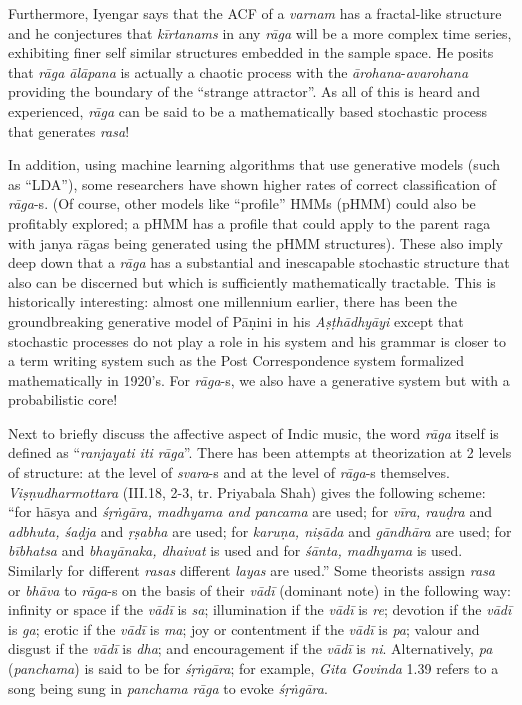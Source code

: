 Furthermore, Iyengar says that the ACF of a \textsl{varnam} has a fractal-like structure and he conjectures that \textsl{kīrtanams} in any \textsl{rāga} will be a more complex time series, exhibiting finer self similar structures embedded in the sample space. He posits that \textsl{rāga ālāpana} is actually a chaotic process with the \textsl{ārohana}-\textsl{avarohana} providing the boundary of the “strange attractor”. As all of this is heard and experienced, \textsl{rāga} can be said to be a mathematically based stochastic process that generates \textsl{rasa}!

In addition, using machine learning algorithms that use generative models (such as “LDA”), some researchers have shown higher rates of correct classification of \textsl{rāga}-s. (Of course, other models like “profile” HMMs (pHMM) could also be profitably explored; a pHMM has a profile that could apply to the parent raga with janya rāgas being generated using the pHMM structures). These also imply deep down that a \textsl{rāga} has a substantial and inescapable stochastic structure that also can be discerned but which is sufficiently mathematically tractable. This is historically interesting: almost one millennium earlier, there has been the groundbreaking generative model of Pāṇini in his \textsl{Aṣṭhādhyāyi} except that stochastic processes do not play a role in his system and his grammar is closer to a term writing system such as the Post Correspondence system formalized mathematically in 1920’s. For \textsl{rāga}-s, we also have a generative system but with a probabilistic core!

Next to briefly discuss the affective aspect of Indic music, the word \textsl{rāga} itself is defined as “\textsl{ranjayati iti rāga}”. There has been attempts at theorization at 2 levels of structure: at the level of \textsl{svara}-s and at the level of \textsl{rāga}-s themselves. \textsl{Viṣṇudharmottara} (III.18, 2-3, tr. Priyabala Shah) gives the following scheme: “for hāsya and \textsl{śṛṅgāra, madhyama and pancama} are used; for \textsl{vīra, rauḍra} and \textsl{adbhuta, śaḍja} and \textsl{ṛṣabha} are used; for \textsl{karuṇa, niṣāda} and \textsl{gāndhāra} are used; for \textsl{bībhatsa} and \textsl{bhayānaka, dhaivat} is used and for \textsl{śānta, madhyama} is used. Similarly for different \textsl{rasas} different \textsl{layas} are used.” Some theorists assign \textsl{rasa} or \textsl{bhāva} to \textsl{rāga}-s on the basis of their \textsl{vādī} (dominant note) in the following way: infinity or space if the \textsl{vādī} is \textsl{sa}; illumination if the \textsl{vādī} is \textsl{re}; devotion if the \textsl{vādī} is \textsl{ga}; erotic if the \textsl{vādī} is \textsl{ma}; joy or contentment if the \textsl{vādī} is \textsl{pa}; valour and disgust if the \textsl{vādī} is \textsl{dha}; and encouragement if the \textsl{vādī} is \textsl{ni}. Alternatively, \textsl{pa} (\textsl{panchama}) is said to be for \textsl{śṛṅgāra}; for example, \textsl{Gita Govinda} 1.39 refers to a song being sung in \textsl{panchama rāga} to evoke \textsl{śṛṅgāra}.


